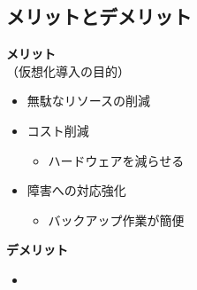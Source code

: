\subsection{メリットとデメリット}
\begin{frame}[t]{\ftitle}
    \begin{minipage}[t]{.49\textwidth}
        \textbf{\cmark メリット}\\\hspace{1\zw}（仮想化導入の目的）
        \begin{itemize}
            \item 無駄なリソースの削減
            \item コスト削減
                  \begin{itemize}
                      \item ハードウェアを減らせる
                  \end{itemize}
            \item 障害への対応強化
                  \begin{itemize}
                      \item バックアップ作業が簡便
                  \end{itemize}
        \end{itemize}
    \end{minipage}
    \begin{minipage}[t]{.49\textwidth}
        \textbf{\xmark デメリット}\\
        \begin{itemize}
            \item
        \end{itemize}
    \end{minipage}
\end{frame}